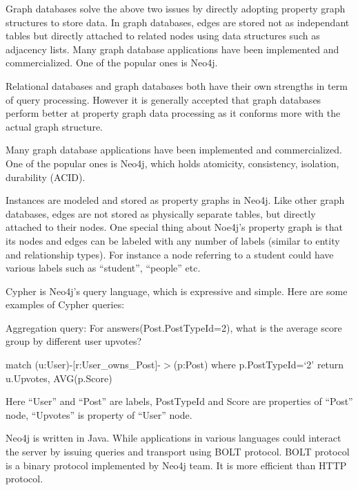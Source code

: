 Graph databases solve the above two issues by directly adopting property graph structures to store data. In graph databases, edges are stored not as independant tables but directly attached to related nodes using data structures such as adjacency lists. Many graph database applications have been implemented and commercialized. One of the popular ones is Neo4j.
 
Relational databases and graph databases both have their own strengths in term of query processing. However it is generally accepted that graph databases perform better at property graph data processing as it conforms more with the actual graph structure. 

Many graph database applications have been implemented and commercialized. One of the popular ones is Neo4j, which holds atomicity, consistency, isolation, durability (ACID). 
 
Instances are modeled and stored as  property graphs in Neo4j. Like other graph databases, edges are not stored as physically separate tables, but directly attached to their nodes. One special thing about Noe4j’s property graph is that its nodes and edges can be labeled with any number of labels (similar to entity and relationship types). For instance a node referring to a student could have various labels such as “student”, “people” etc. 

Cypher is Neo4j’s query language, which is expressive and simple. Here are some examples of Cypher queries:

Aggregation query: For answers(Post.PostTypeId=2), what is the average score group by different user upvotes?
 
match (u:User)-[r:User\_owns\_Post]-$>$(p:Post) where p.PostTypeId=`2' return u.Upvotes, AVG(p.Score)
 
Here “User” and “Post” are labels, PostTypeId and Score are properties of “Post” node, “Upvotes” is property of “User” node.
 
Neo4j is written in Java. While applications in various languages could interact the server by issuing queries and transport using BOLT protocol. BOLT protocol is a binary protocol implemented by Neo4j team. It is more efficient than HTTP protocol. 

%


